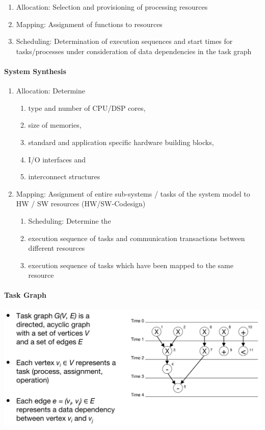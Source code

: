 \documentclass[english]{latex4ei/latex4ei_sheet}
\begin{document}
\begin{enumerate}
	\item Allocation: Selection and provisioning of processing resources
	\item Mapping: Assignment of functions to resources
	\item Scheduling: Determination of execution sequences and start times for tasks/processes under consideration of data dependencies in the task graph
\end{enumerate}

\paragraph{System Synthesis}
\begin{enumerate}
  \item Allocation: Determine
    \begin{enumerate}
      \item type and number of CPU/DSP cores,
      \item size of memories,
      \item standard and application specific hardware building blocks,
      \item  I/O interfaces and
      \item interconnect structures
    \end{enumerate}
  \item Mapping: Assignment of entire sub-systems / tasks of the system model to HW / SW resources (HW/SW-Codesign)
    \begin{enumerate}
      \item Scheduling: Determine the
      \item execution sequence of tasks and communication transactions between different resources
      \item execution sequence of tasks which have been mapped to the same resource
    \end{enumerate}
\end{enumerate}

\paragraph{Task Graph}

\begin{center}
  \includegraphics[width=\linewidth]{assets/TaskGraph.png}
  \label{fig:taskgraph}
\end{center}
\end{document}
